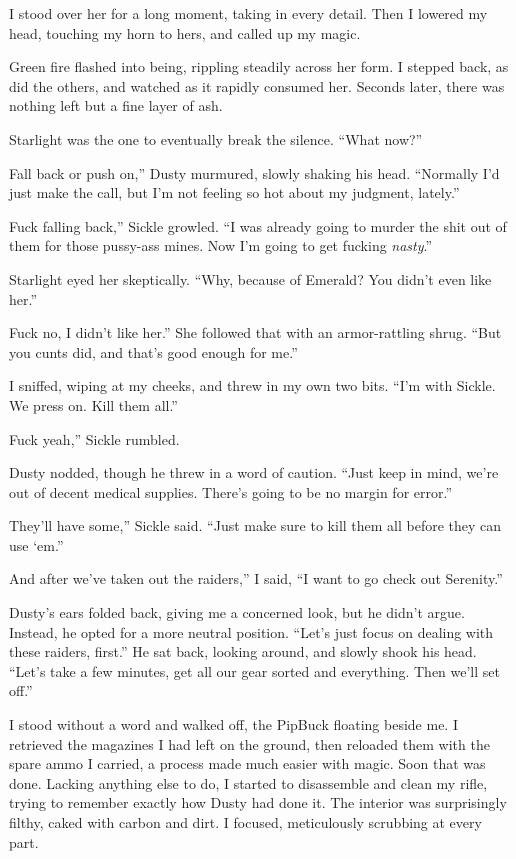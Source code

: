 I stood over her for a long moment, taking in every detail. Then I lowered my head, touching my horn to hers, and called up my magic.

Green fire flashed into being, rippling steadily across her form. I stepped back, as did the others, and watched as it rapidly consumed her. Seconds later, there was nothing left but a fine layer of ash.

Starlight was the one to eventually break the silence. “What now?”

\leavevmode{}Fall back or push on,” Dusty murmured, slowly shaking his head. “Normally I’d just make the call, but I’m not feeling so hot about my judgment, lately.”

\leavevmode{}Fuck falling back,” Sickle growled. “I was already going to murder the shit out of them for those pussy-ass mines. Now I’m going to get fucking \textit{nasty}.”

Starlight eyed her skeptically. “Why, because of Emerald? You didn’t even like her.”

\leavevmode{}Fuck no, I didn’t like her.” She followed that with an armor-rattling shrug. “But you cunts did, and that’s good enough for me.”

I sniffed, wiping at my cheeks, and threw in my own two bits. “I’m with Sickle. We press on. Kill them all.”

\leavevmode{}Fuck yeah,” Sickle rumbled.

Dusty nodded, though he threw in a word of caution. “Just keep in mind, we’re out of decent medical supplies. There’s going to be no margin for error.”

\leavevmode{}They’ll have some,” Sickle said. “Just make sure to kill them all before they can use ‘em.”

\leavevmode{}And after we’ve taken out the raiders,” I said, “I want to go check out Serenity.”

Dusty’s ears folded back, giving me a concerned look, but he didn’t argue. Instead, he opted for a more neutral position. “Let’s just focus on dealing with these raiders, first.” He sat back, looking around, and slowly shook his head. “Let’s take a few minutes, get all our gear sorted and everything. Then we’ll set off.”

I stood without a word and walked off, the PipBuck floating beside me. I retrieved the magazines I had left on the ground, then reloaded them with the spare ammo I carried, a process made much easier with magic. Soon that was done. Lacking anything else to do, I started to disassemble and clean my rifle, trying to remember exactly how Dusty had done it. The interior was surprisingly filthy, caked with carbon and dirt. I focused, meticulously scrubbing at every part.

